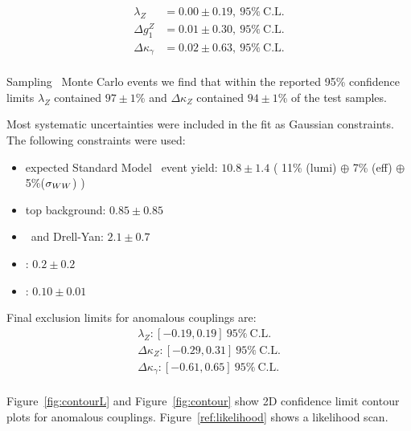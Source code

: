 
\begin{align}
  \lambda_{Z} &= 0.00\pm0.19, ~95\%~\mathrm{C.L.} \\ 
  \Delta g^Z_1 &= 0.01\pm0.30, ~95\%~\mathrm{C.L.}\\
  \Delta\kappa_\gamma &= 0.02\pm0.63, ~95\%~\mathrm{C.L.}\\
\end{align}


Sampling \wwll\ Monte Carlo events we find that within the reported 95\%
confidence limits $\lambda_{Z}$ contained $97\pm1$\% and
$\Delta\kappa_{Z}$ contained $94\pm1$\% of the test samples.

Most systematic uncertainties were included in the fit as Gaussian
constraints. The following constraints were used:
\begin{itemize}
  \item expected Standard Model \ww\ event yield: $10.8\pm1.4$ ( 11\%
    (lumi) $\oplus$ 7\% (eff) $\oplus$ 5\%($\sigma_{WW}$) )
  \item top background: $0.85\pm0.85$
  \item \wjets\ and Drell-Yan: $2.1\pm0.7$
  \item \wz{}: $0.2\pm0.2$
  \item \zz{}: $0.10\pm0.01$
\end{itemize}


Final exclusion limits for anomalous couplings are:
\begin{align}
  \lambda_{Z}: [-0.19,0.19]~95\%~\mathrm{C.L.}\\ 
  \Delta\kappa_{Z}: [-0.29,0.31]~95\%~\mathrm{C.L.}\\
  \Delta\kappa_\gamma: [-0.61,0.65]~95\%~\mathrm{C.L.}\\
\end{align}

Figure~\ref{fig:contourL} and Figure~\ref{fig:contour} show 2D
confidence limit contour plots for anomalous
couplings. Figure~\ref{ref:likelihood} shows a likelihood scan.


